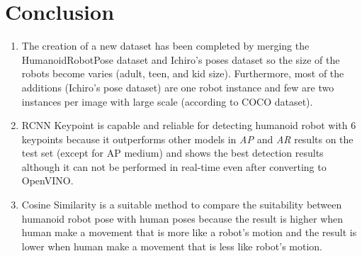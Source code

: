 \section{Conclusion}
\label{sec:conclusion}


\begin{enumerate}

      \item The creation of a new dataset has been completed by merging the HumanoidRobotPose dataset and Ichiro's poses dataset 
            so the size of the robots become varies (adult, teen, and kid size). Furthermore, most of the additions (Ichiro's pose dataset) are one robot instance and
            few are two instances per image with large scale (according to COCO dataset).
      \item RCNN Keypoint is capable and reliable for detecting humanoid robot with 6 keypoints because it outperforms other models in \emph{AP} and \emph{AR} results on the test set (except for AP medium)
            and shows the best detection results although it can not be performed in real-time even after converting to OpenVINO.
      \item Cosine Similarity is a suitable method to compare the suitability between humanoid robot pose with human poses because the result is higher when
            human make a movement that is more like a robot's motion and the result is lower when human make a movement that is less like robot's motion.
\end{enumerate}
